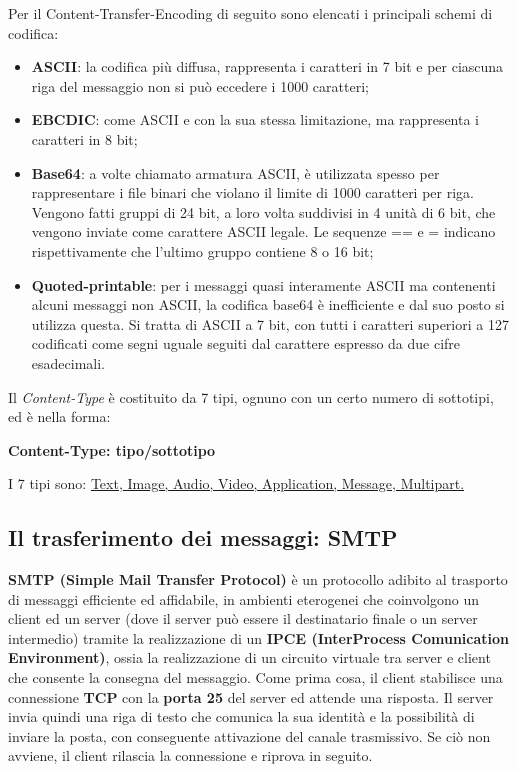             Per il Content-Transfer-Encoding di seguito sono elencati i principali schemi di codifica:

            \begin{itemize}
                \item \textbf{ASCII}: la codifica più diffusa, rappresenta i caratteri in 7 bit e per ciascuna riga del
                messaggio non si può eccedere i 1000 caratteri;
                \item \textbf{EBCDIC}: come ASCII e con la sua stessa limitazione, ma rappresenta i caratteri in 8 bit;
                \item \textbf{Base64}: a volte chiamato armatura ASCII, è utilizzata spesso per rappresentare i file
                binari che violano il limite di 1000 caratteri per riga. Vengono fatti gruppi di 24 bit, a
                loro volta suddivisi in 4 unità di 6 bit, che vengono inviate come carattere ASCII legale.
                Le sequenze == e = indicano rispettivamente che l’ultimo gruppo contiene 8 o 16 bit;
                \item \textbf{Quoted-printable}: per i messaggi quasi interamente ASCII ma contenenti alcuni
                messaggi non ASCII, la codifica base64 è inefficiente e dal suo posto si utilizza questa. Si
                tratta di ASCII a 7 bit, con tutti i caratteri superiori a 127 codificati come segni uguale
                seguiti dal carattere espresso da due cifre esadecimali.
            \end{itemize}
            
            Il \textit{Content-Type} è costituito da 7 tipi, ognuno con un certo numero di sottotipi, ed è nella forma:

            \begin{center}
                \textbf{Content-Type: tipo/sottotipo}
            \end{center}

            I 7 tipi sono: \underline{Text, Image, Audio, Video, Application, Message, Multipart.}

    \subsection{Il trasferimento dei messaggi: SMTP}
        \textbf{SMTP (Simple Mail Transfer Protocol)} è un protocollo adibito al trasporto di messaggi
        efficiente ed affidabile, in ambienti eterogenei che coinvolgono un client ed un server (dove il
        server può essere il destinatario finale o un server intermedio) tramite la realizzazione di un
        \textbf{IPCE (InterProcess Comunication Environment)}, ossia la realizzazione di un circuito
        virtuale tra server e client che consente la consegna del messaggio.
        Come prima cosa, il client stabilisce una connessione \textbf{TCP} con la \textbf{porta 25} del server ed attende
        una risposta. Il server invia quindi una riga di testo che comunica la sua identità e la possibilità
        di inviare la posta, con conseguente attivazione del canale trasmissivo. Se ciò non avviene, il
        client rilascia la connessione e riprova in seguito.\\

